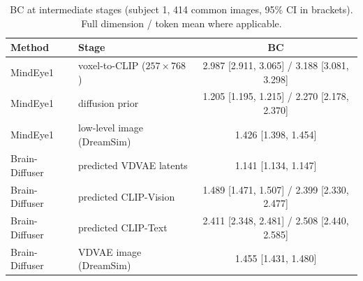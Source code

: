 \documentclass[11pt,a4paper]{article}
\begin{document}
\begin{table}[htbp]
\centering
\caption{BC at intermediate stages (subject 1, 414 common images, 95\% CI in
  brackets). Full dimension / token mean where applicable.}
\label{tab:inter}
\footnotesize
\begin{tabular}{llc}
\toprule
Method & Stage & BC \\
\midrule
MindEye1       & voxel-to-CLIP ($257\times768$)   & 2.987 [2.911, 3.065] / 3.188 [3.081, 3.298] \\
MindEye1       & diffusion prior                  & 1.205 [1.195, 1.215] / 2.270 [2.178, 2.370] \\
MindEye1       & low-level image (DreamSim)       & 1.426 [1.398, 1.454] \\
Brain-Diffuser & predicted VDVAE latents          & 1.141 [1.134, 1.147] \\
Brain-Diffuser & predicted CLIP-Vision            & 1.489 [1.471, 1.507] / 2.399 [2.330, 2.477] \\
Brain-Diffuser & predicted CLIP-Text              & 2.411 [2.348, 2.481] / 2.508 [2.440, 2.585] \\
Brain-Diffuser & VDVAE image (DreamSim)           & 1.455 [1.431, 1.480] \\
\bottomrule
\end{tabular}
\end{table}
\end{document}
